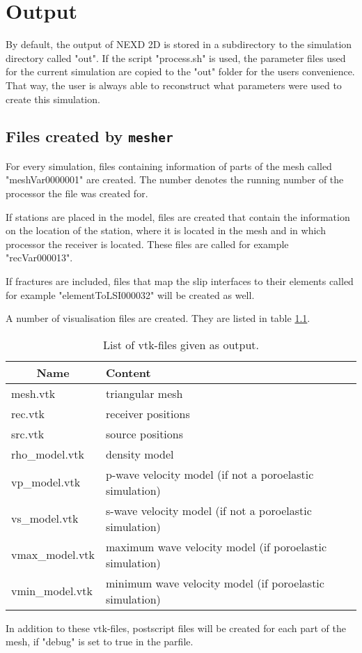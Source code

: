 \chapter{Output}
\label{chap:output}
	By default, the output of NEXD 2D is stored in a subdirectory to the simulation directory called "out". If the script "process.sh" is used, the parameter files used for the current simulation are copied to the "out" folder for the users convenience. That way, the user is always able to reconstruct what parameters were used to create this simulation. 
	
	\section{Files created by \texttt{mesher}}
	\label{sec:mesher}
		For every simulation, files containing information of parts of the mesh called "meshVar0000001" are created. The number denotes the running number of the processor the file was created for.
		
		If stations are placed in the model, files are created that contain the information on the location of the station, where it is located in the mesh and in which processor the receiver is located. These files are called for example "recVar000013".
		
		If fractures are included, files that map the slip interfaces to their elements called for example "elementToLSI000032" will be created as well.
		
		A number of visualisation files are created. They are listed in table \ref{tab:vtk_files}.
		\begin{table}[ht]
   			\centering
    		\caption{List of vtk-files given as output.}
    		\label{tab:vtk_files}
    		\begin{tabular}{@{} l p{9cm} @{}}
        		\toprule
        		\multicolumn{1}{c}{Name} & Content\\ 
        		\midrule
        		mesh.vtk & triangular mesh \\
        		rec.vtk & receiver positions \\    
       			src.vtk & source positions \\
        		rho\_model.vtk & density model \\
        		vp\_model.vtk & p-wave velocity model (if not a poroelastic simulation) \\
        		vs\_model.vtk & s-wave velocity model (if not a poroelastic simulation) \\
        		vmax\_model.vtk & maximum wave velocity model (if poroelastic simulation) \\
        		vmin\_model.vtk & minimum wave velocity model (if poroelastic simulation) \\
        		\bottomrule
    		\end{tabular}
		\end{table}
		In addition to these vtk-files, postscript files will be created for each part of the mesh, if "debug" is set to true in the parfile.
